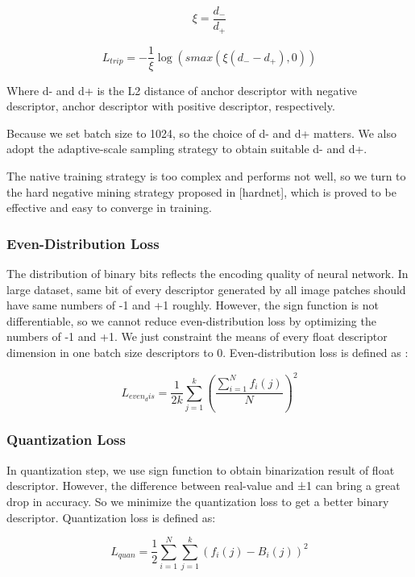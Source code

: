 \documentclass{svproc}
\begin{document}
\begin{equation}
\xi  = \frac{d _{-}}{d _{+}}
\end{equation}

\begin{equation}
L_{trip}  = - \frac{1}{\xi}\log (smax(\xi( d _{-} - d _{+}  ) , 0)) 
\end{equation}

Where d- and d+ is the L2 distance of anchor descriptor with negative descriptor, anchor descriptor with positive descriptor, respectively. 

Because we set batch size to 1024, so the choice of d- and d+ matters. We also adopt the adaptive-scale sampling strategy to obtain suitable d- and d+.

The native training strategy is too complex and performs not well, so we turn to the hard negative mining strategy proposed in [hardnet], which is proved to be effective and easy to converge in training. 

\subsubsection{Even-Distribution Loss} 
The distribution of binary bits reflects the encoding quality of neural network. In large dataset, same bit of every descriptor generated by all image patches should have same numbers of -1 and +1 roughly. However, the sign function is not differentiable, so we cannot reduce even-distribution loss by optimizing the numbers of -1 and +1. We just constraint the means of every float descriptor dimension in one batch size descriptors to 0. Even-distribution loss is defined as :

\begin{equation}
L_{even_dis}  =  \frac{1}{2k}\sum\limits_{j=1}^{k}\left(\frac{\sum\limits_{i=1}^{N}f_i(j)}{N}\right )^2
\end{equation}


\subsubsection{Quantization Loss} 
In quantization step, we use sign function to obtain binarization result of float descriptor. However, the difference between real-value and ±1 can bring a great drop in accuracy. So we minimize the quantization loss to get a better binary descriptor. Quantization loss is defined as:

\begin{equation}
L_{quan}  =  \frac{1}{2}\sum\limits_{i=1}^{N} \sum\limits_{j=1}^{k} \left(f_i(j)-B_i(j) \right )^2
\end{equation}
\end{document}
